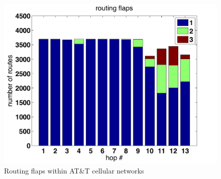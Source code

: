 \begin{figure}
  \centering
  \includegraphics[width=\linewidth]{../figs/routing_flaps.pdf}
  \caption{Routing flaps within AT\&T cellular networks}
  \label{fig:mobile_flaps}
\end{figure}


